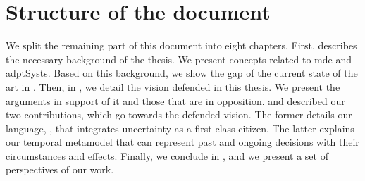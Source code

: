 \section{Structure of the document}

We split the remaining part of this document into eight chapters.
First,  describes the necessary background of the thesis.
We present concepts related to \gls{mde} and \glspl{adptSyst}.
Based on this background, we show the gap of the current state of the art in .
Then, in , we detail the vision defended in this thesis.
We present the arguments in support of it and those that are in opposition.
 and  described our two contributions, which go towards the defended vision.
The former details our language, \langName, that integrates uncertainty as a first-class citizen.
The latter explains our temporal metamodel that can represent past and ongoing decisions with their circumstances and effects.
Finally, we conclude in , and we present a set of perspectives of our work.